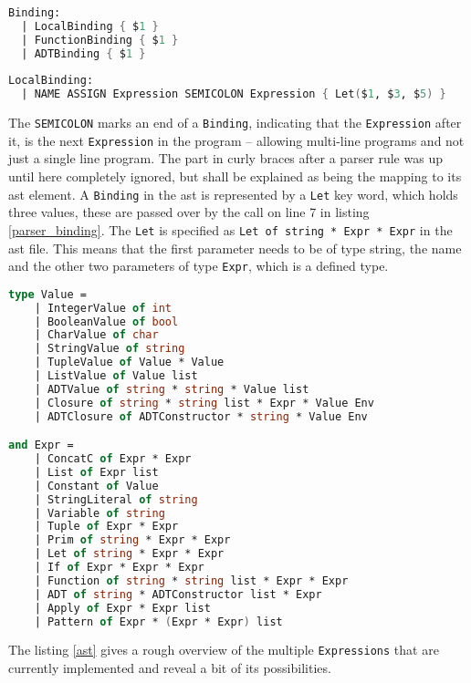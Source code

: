 \begin{lstlisting}[columns=fullflexible, label={parser_binding}, language=FSharp, caption=Binding with \texttt{Expression} afterwards]
Binding:
  | LocalBinding { $1 }
  | FunctionBinding { $1 }
  | ADTBinding { $1 }
  
LocalBinding:
  | NAME ASSIGN Expression SEMICOLON Expression { Let($1, $3, $5) }
\end{lstlisting}

The \texttt{SEMICOLON} marks an end of a \texttt{Binding}, indicating that the \texttt{Expression} after it, is the next \texttt{Expression} in the program -- allowing multi-line programs and not just a single line program. The part in curly braces after a parser rule was up until here completely ignored, but shall be explained as being the mapping to its \gls{ast} element. A \texttt{Binding} in the \gls{ast} is represented by a \texttt{Let} key word, which holds three values, these are passed over by the call on line 7 in listing \ref{parser_binding}.
The \texttt{Let} is specified as \texttt{Let of string * Expr * Expr} in the \gls{ast} file. This means that the first parameter needs to be of type string, the name and the other two parameters of type \texttt{Expr}, which is a defined type.

\begin{lstlisting}[columns=fullflexible, label={ast}, language=FSharp, caption=An excerpt of the \gls{ast} of JaLi]
type Value =    
    | IntegerValue of int
    | BooleanValue of bool
    | CharValue of char
    | StringValue of string
    | TupleValue of Value * Value
    | ListValue of Value list
    | ADTValue of string * string * Value list
    | Closure of string * string list * Expr * Value Env
    | ADTClosure of ADTConstructor * string * Value Env

and Expr =
    | ConcatC of Expr * Expr
    | List of Expr list
    | Constant of Value
    | StringLiteral of string
    | Variable of string
    | Tuple of Expr * Expr
    | Prim of string * Expr * Expr
    | Let of string * Expr * Expr
    | If of Expr * Expr * Expr
    | Function of string * string list * Expr * Expr
    | ADT of string * ADTConstructor list * Expr
    | Apply of Expr * Expr list
    | Pattern of Expr * (Expr * Expr) list
\end{lstlisting}

\vspace{0.3cm}

The listing \ref{ast} gives a rough overview of the multiple \texttt{Expressions} that are currently implemented and reveal a bit of its possibilities.

